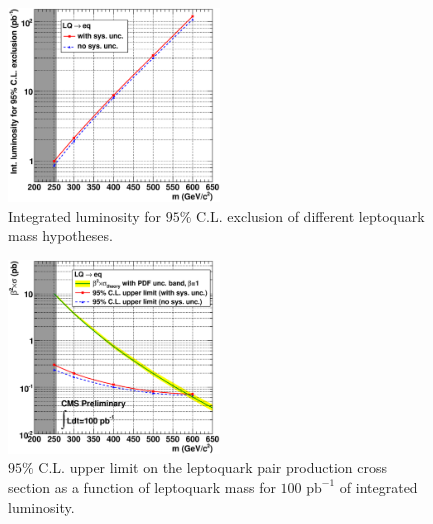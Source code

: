 \begin{figure}[h!]
 \centering
  \includegraphics[width=0.5\textwidth]{plots/cmsPotential/L95CL_vs_m_log.eps}
 \caption{Integrated luminosity
for $95\%$ C.L. exclusion of different leptoquark mass hypotheses.\label{fig:exclusion}}
\end{figure}
\begin{figure}[h!]
 \centering
  \includegraphics[width=0.5\textwidth]{plots/cmsPotential/xs95CL_vs_m_log.eps}
 \caption{$95\%$ C.L. upper limit on the leptoquark pair production cross section as a function of leptoquark mass for $100\text{ pb}^{-1}$
of integrated luminosity.\label{fig:exclusion_xs}}
\end{figure}



